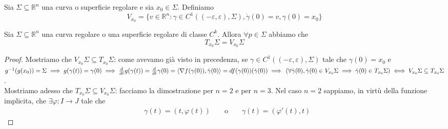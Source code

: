 \documentclass[openany, italian]{book}
\begin{document}
\begin{definition}
Sia $\Sigma \subseteq \mathbb{R}^n$ una curva o superficie regolare e sia $x_0 \in \Sigma$. Definiamo
$$
V_{x_0} = \{ v \in \mathbb{R}^n: \gamma \in C^{1}((-\varepsilon, \varepsilon), \Sigma), \dot{\gamma}(0) = v, \gamma(0) = x_0 \}
$$
\end{definition}
\begin{theorem}
Sia $\Sigma \subseteq \mathbb{R}^n$ una curva regolare o una superficie regolare di classe $C^k$. Allora $\forall p \in \Sigma$ abbiamo che
$$
T_{x_0} \Sigma = V_{x_0} \Sigma
$$
\label{thm:caratt_tang}
\end{theorem}
\begin{proof}
Mostriamo che $V_{x_0} \Sigma \subseteq T_{x_0} \Sigma$: come avevamo già visto in precedenza, se $\gamma \in C^{1}((-\varepsilon, \varepsilon), \Sigma)$ tale che $\gamma(0)=x_0$ e $g^{-1}(g(x_0)) = \Sigma \implies g(\gamma(t)) = \gamma(0) \implies \frac{d}{dt} g(\gamma(t)) = \frac{d}{dt} \gamma(0) = \langle \nabla f(\gamma(0)), \dot{\gamma}(0) \rangle = df(\gamma(0))(\dot{\gamma}(0)) \implies \, (\forall \dot{\gamma}(0), \dot{\gamma}(0) \in V_{x_0} \Sigma \implies \dot{\gamma}(0) \in T_{x_0} \Sigma) \iff V_{x_0} \Sigma \subseteq T_{x_0} \Sigma$. \\
Mostriamo adesso che $T_{x_0} \Sigma \subseteq V_{x_0} \Sigma$: facciamo la dimostrazione per $n=2$ e per $n=3$. Nel caso $n=2$ sappiamo, in virtù della funzione implicita, che $\exists \varphi: I \to J$ tale che 
\begin{align*}
&\gamma(t) = (t, \varphi(t)) & &\text{ o } & &\gamma(t)=(\varphi'(t), t)
\end{align*}


\end{proof}
\end{document}
